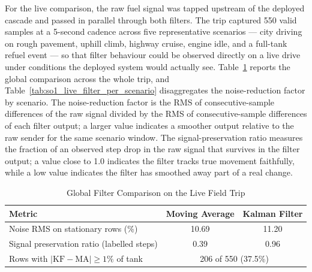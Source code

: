 For the live comparison, the raw fuel signal was tapped upstream of the deployed cascade and passed in parallel through both filters. The trip captured 550 valid samples at a 5-second cadence across five representative scenarios --- city driving on rough pavement, uphill climb, highway cruise, engine idle, and a full-tank refuel event --- so that filter behaviour could be observed directly on a live drive under conditions the deployed system would actually see. Table~\ref{tab:so1_live_filter_global} reports the global comparison across the whole trip, and Table~\ref{tab:so1_live_filter_per_scenario} disaggregates the noise-reduction factor by scenario. The noise-reduction factor is the RMS of consecutive-sample differences of the raw signal divided by the RMS of consecutive-sample differences of each filter output; a larger value indicates a smoother output relative to the raw sender for the same scenario window. The signal-preservation ratio measures the fraction of an observed step drop in the raw signal that survives in the filter output; a value close to 1.0 indicates the filter tracks true movement faithfully, while a low value indicates the filter has smoothed away part of a real change.

\addtocounter{table}{-1}
\begin{table}[!htbp]
\centering
\caption{Global Filter Comparison on the Live Field Trip}
\label{tab:so1_live_filter_global}
\small
\begin{tabular}{|p{}|c|c|}
\hline
\textbf{Metric} & \textbf{Moving Average} & \textbf{Kalman Filter} \\
\hline
Noise RMS on stationary rows (\%)              & 10.69 & 11.20 \\
\hline
Signal preservation ratio (labelled steps)     & 0.39 & 0.96 \\
\hline
Rows with $|\mathrm{KF} - \mathrm{MA}| \geq 1\%$ of tank & \multicolumn{2}{c|}{206 of 550 (37.5\%)} \\
\hline
\end{tabular}
\end{table}

